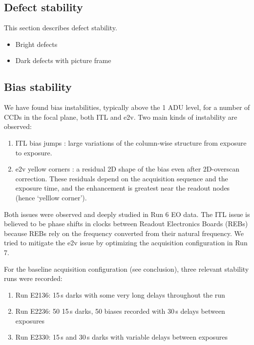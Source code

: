 \subsection{Defect stability}\label{defect-stability}

This section describes defect stability.

\begin{itemize}
\tightlist
\item
  Bright defects
\item
  Dark defects with picture frame
\end{itemize}

\subsection{Bias stability}\label{sec:bias-stability-2}

We have found bias instabilities, typically above the 1 ADU level, for a number of CCDs in the focal plane, both ITL and e2v. Two main kinds of instability are observed:

\begin{enumerate}
\tightlist
\item
  ITL bias jumps : large variations of the column-wise structure from
  exposure to exposure.
\item
  e2v yellow corners : a residual 2D shape of the bias even after
  2D-overscan correction. These residuals depend on the acquisition
  sequence and the exposure time, and the enhancement is greatest near the readout nodes (hence `yelllow corner').
\end{enumerate}

Both issues were observed and deeply studied in Run 6 EO data. The ITL
issue is believed to be phase shifts in clocks between Readout
Electronics Boards (REBs) because REBs rely on the frequency converted
from their natural frequency. We tried to mitigate the e2v issue by
optimizing the acquisition configuration in Run 7.

For the baseline acquisition configuration (see conclusion), three
relevant stability runs were recorded:

\begin{enumerate}
\tightlist
\item
  Run E2136: 15\,s darks with some very long delays throughout the run
\item
  Run E2236: 50 15\,s darks, 50 biases recorded with 30\,s delays between
  exposures
\item
  Run E2330: 15\,s and 30\,s darks with variable delays between exposures
\end{enumerate}

